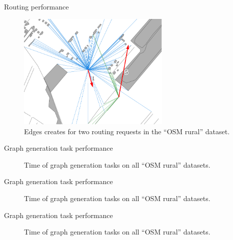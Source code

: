 \documentclass[xcolor={x11names}]{beamer}
\newenvironment{figcenter}
{%
	\parskip=0pt%
	\par%
	\nopagebreak%
	\centering%
}%
{%
	\par%
	\noindent%
	\ignorespacesafterend%
}
\begin{document}
	\begin{frame}{Routing performance}
		\begin{figure}
			\begin{figcenter}
				\includegraphics[width=0.65\textwidth]{../thesis/images/qgis-osm-rural.pdf}
			\end{figcenter}
			\caption{Edges creates for two routing requests in the \enquote{OSM rural} dataset.}
		\end{figure}
	\end{frame}
	
	\begin{frame}{Graph generation task performance}
		\begin{figure}
			\begin{figcenter}
				\hspace*{-0.35cm}
				\scalebox{0.7}
				{
					
				}
			\end{figcenter}
			\caption{Time of graph generation tasks on all \enquote{OSM rural} datasets.}
		\end{figure}
	\end{frame}
	
	\begin{frame}{Graph generation task performance}
		\begin{figure}
			\begin{figcenter}
				\hspace*{-0.35cm}
				\scalebox{0.7}
				{
					
				}
			\end{figcenter}
			\caption{Time of graph generation tasks on all \enquote{OSM rural} datasets.}
		\end{figure}
	\end{frame}
	
	\begin{frame}{Graph generation task performance}
		\begin{figure}
			\begin{figcenter}
				\hspace*{-0.35cm}
				\scalebox{0.7}
				{
					
				}
			\end{figcenter}
			\caption{Time of graph generation tasks on all \enquote{OSM rural} datasets.}
		\end{figure}
	\end{frame}
\end{document}
